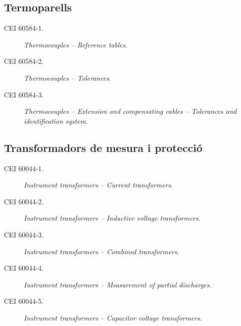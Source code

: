 \subsection*{Termoparells} 
\begin{description}
    \item [\hspace{5mm}CEI 60584-1.] \textit{Thermocouples -- Reference tables}.
    \item [\hspace{5mm}CEI 60584-2.] \textit{Thermocouples -- Tolerances}.
    \item [\hspace{5mm}CEI 60584-3.] \textit{Thermocouples -- Extension and compensating cables -- Tolerances and identification system}.
\end{description}


\subsection*{Transformadors de mesura i protecció}
\begin{description}
    \item [\hspace{5mm}CEI 60044-1.] \textit{Instrument transformers -- Current transformers}.
    \item [\hspace{5mm}CEI 60044-2.] \textit{Instrument transformers -- Inductive voltage transformers}.
    \item [\hspace{5mm}CEI 60044-3.] \textit{Instrument transformers -- Combined transformers}.
    \item [\hspace{5mm}CEI 60044-4.] \textit{Instrument transformers -- Measurement of partial discharges}.
    \item [\hspace{5mm}CEI 60044-5.] \textit{Instrument transformers -- Capacitor voltage transformers}.
\end{description}



